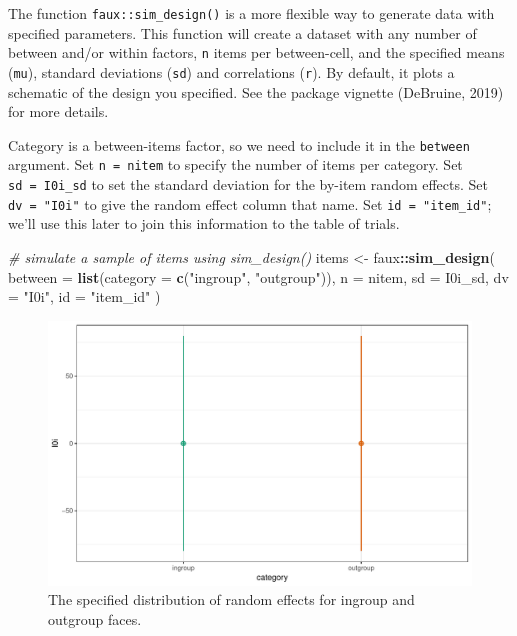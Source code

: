 \documentclass[doc,floatsintext]{apa6}
\newenvironment{Shaded}{\begin{snugshade}}{\end{snugshade}}
\newcommand{\KeywordTok}[1]{\textcolor[rgb]{0.13,0.29,0.53}{\textbf{#1}}}
\newcommand{\DataTypeTok}[1]{\textcolor[rgb]{0.13,0.29,0.53}{#1}}
\newcommand{\StringTok}[1]{\textcolor[rgb]{0.31,0.60,0.02}{#1}}
\newcommand{\CommentTok}[1]{\textcolor[rgb]{0.56,0.35,0.01}{\textit{#1}}}
\newcommand{\OperatorTok}[1]{\textcolor[rgb]{0.81,0.36,0.00}{\textbf{#1}}}
\newcommand{\NormalTok}[1]{#1}
\begin{document}
The function \texttt{faux::sim\_design()} is a more flexible way to
generate data with specified parameters. This function will create a
dataset with any number of between and/or within factors, \texttt{n}
items per between-cell, and the specified means (\texttt{mu}), standard
deviations (\texttt{sd}) and correlations (\texttt{r}). By default, it
plots a schematic of the design you specified. See the package vignette
(DeBruine, 2019) for more details.

Category is a between-items factor, so we need to include it in the
\texttt{between} argument. Set \texttt{n\ =\ nitem} to specify the
number of items per category. Set \texttt{sd\ =\ I0i\_sd} to set the
standard deviation for the by-item random effects. Set
\texttt{dv\ =\ "I0i"} to give the random effect column that name. Set
\texttt{id\ =\ "item\_id"}; we'll use this later to join this
information to the table of trials.

\begin{Shaded}
\begin{Highlighting}[]
\CommentTok{# simulate a sample of items using sim_design()}
\NormalTok{items <-}\StringTok{ }\NormalTok{faux}\OperatorTok{::}\KeywordTok{sim_design}\NormalTok{(}
  \DataTypeTok{between =} \KeywordTok{list}\NormalTok{(}\DataTypeTok{category =} \KeywordTok{c}\NormalTok{(}\StringTok{"ingroup"}\NormalTok{, }\StringTok{"outgroup"}\NormalTok{)),}
  \DataTypeTok{n =}\NormalTok{ nitem,}
  \DataTypeTok{sd =}\NormalTok{ I0i_sd,}
  \DataTypeTok{dv =} \StringTok{"I0i"}\NormalTok{,}
  \DataTypeTok{id =} \StringTok{"item_id"}
\NormalTok{)}
\end{Highlighting}
\end{Shaded}

\begin{figure}

{\centering \includegraphics[width=0.75\linewidth]{images/sim-items-1} 

}

\caption{The specified distribution of random effects for ingroup and outgroup faces.}\label{fig:sim-items}
\end{figure}
\end{document}
